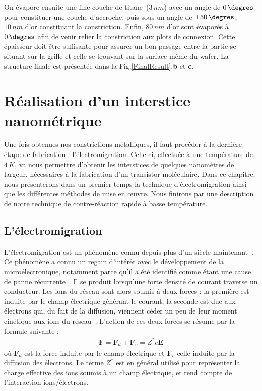 On évapore ensuite une fine couche de titane~(3$\, nm$) avec un angle de $0\,\degres$ pour constituer une couche d'accroche, puis sous un angle de $\pm30\,\degres$, $10\, nm$ d'or  constituant la constriction. Enfin, $80\,nm$ d'or sont évaporés à $0\,\degres$ afin de venir relier la constriction aux plots de connexion. Cette épaisseur doit être suffisante pour assurer un bon passage entre la partie se situant sur la grille et celle se trouvant sur la surface même du wafer. La structure finale est présentée dans la Fig.\ref{FinalResult}.\textbf{b} et \textbf{c}.


\section{Réalisation d'un interstice nanométrique}
Une fois obtenues nos constrictions métalliques, il faut procéder à la dernière étape de fabrication : l'électromigration. Celle-ci, effectuée à une température de $4\,K$, va nous permettre d'obtenir les interstices de quelques nanomètres de largeur, nécessaires à la fabrication d'un transistor moléculaire. Dans ce chapitre, nous présenterons dans un premier temps la technique d'électromigration ainsi que les différentes méthodes de mise en œuvre. Nous finirons par une description de notre technique de contre-réaction rapide à basse température.

\subsection{L'électromigration}
L'électromigration est un phénomène connu depuis plus d'un siècle maintenant~\cite{Gerardin1861}. Ce phénomène a connu un regain d'intérêt avec le développement de la microélectronique, notamment parce qu'il a été identifié comme étant une cause de panne récurrente~\cite{Blech1967,Black1969}.
Il se produit lorsqu'une forte densité de courant traverse un conducteur. Les ions du réseau sont alors soumis à deux forces : la première est induite par le champ électrique générant le courant, la seconde est due aux électrons qui, du fait de la diffusion, viennent céder un peu de leur moment cinétique aux ions du réseau~\cite{Ho1989}. L'action de ces deux forces se résume par la formule suivante :
\begin{eqnarray}
\textbf{F} = \textbf{F}_d + \textbf{F}_v = Z^*e\textbf{E} \nonumber
\end{eqnarray}
où $\textbf{F}_d$ est la force induite par le champ électrique et $\textbf{F}_v$ celle induite par la diffusion des électrons. Le terme $Z^*$ est en général utilisé pour représenter la charge effective des ions soumis à un champ électrique, et rend compte de l'interaction ions/électrons.


